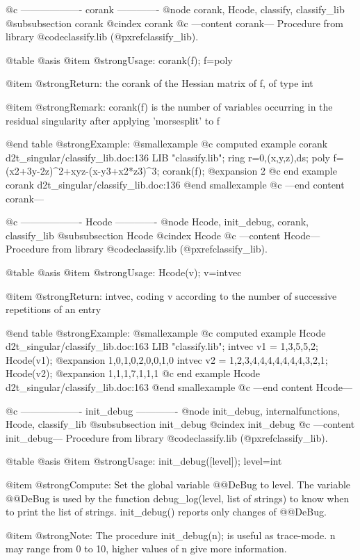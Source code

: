 @c ------------------- corank -------------
@node corank, Hcode, classify, classify_lib
@subsubsection corank
@cindex corank
@c ---content corank---
Procedure from library @code{classify.lib} (@pxref{classify_lib}).

@table @asis
@item @strong{Usage:}
corank(f); f=poly

@item @strong{Return:}
the corank of the Hessian matrix of f, of type int

@item @strong{Remark:}
corank(f) is the number of variables occurring in the residual
singularity after applying 'morsesplit' to f

@end table
@strong{Example:}
@smallexample
@c computed example corank d2t_singular/classify_lib.doc:136 
LIB "classify.lib";
ring r=0,(x,y,z),ds;
poly f=(x2+3y-2z)^2+xyz-(x-y3+x2*z3)^3;
corank(f);
@expansion{} 2
@c end example corank d2t_singular/classify_lib.doc:136
@end smallexample
@c ---end content corank---

@c ------------------- Hcode -------------
@node Hcode, init_debug, corank, classify_lib
@subsubsection Hcode
@cindex Hcode
@c ---content Hcode---
Procedure from library @code{classify.lib} (@pxref{classify_lib}).

@table @asis
@item @strong{Usage:}
Hcode(v); v=intvec

@item @strong{Return:}
intvec, coding v according to the number of successive
repetitions of an entry

@end table
@strong{Example:}
@smallexample
@c computed example Hcode d2t_singular/classify_lib.doc:163 
LIB "classify.lib";
intvec v1 = 1,3,5,5,2;
Hcode(v1);
@expansion{} 1,0,1,0,2,0,0,1,0
intvec v2 = 1,2,3,4,4,4,4,4,4,4,3,2,1;
Hcode(v2);
@expansion{} 1,1,1,7,1,1,1
@c end example Hcode d2t_singular/classify_lib.doc:163
@end smallexample
@c ---end content Hcode---

@c ------------------- init_debug -------------
@node init_debug, internalfunctions, Hcode, classify_lib
@subsubsection init_debug
@cindex init_debug
@c ---content init_debug---
Procedure from library @code{classify.lib} (@pxref{classify_lib}).

@table @asis
@item @strong{Usage:}
init_debug([level]); level=int

@item @strong{Compute:}
Set the global variable @@DeBug to level. The variable @@DeBug is
used by the function debug_log(level, list of strings) to know
when to print the list of strings. init_debug() reports only
changes of @@DeBug.

@item @strong{Note:}
The procedure init_debug(n); is useful as trace-mode. n may
range from 0 to 10, higher values of n give more information.


